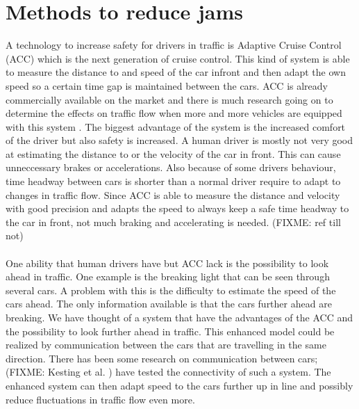 \section{Methods to reduce jams}
A technology to increase safety for drivers in traffic is Adaptive Cruise
Control (ACC) which is the next generation of cruise control. This kind of
system is able to measure the distance to and speed of the car infront and then
adapt the own speed so a certain time gap is maintained between the cars. ACC
is already commercially available on the market and there is much research
going on to determine the effects on traffic flow when more and more vehicles are
equipped with this system \cite{acc}. The biggest advantage of the system
is the increased comfort of the driver but also safety is increased. A human
driver is mostly not very good at estimating the distance to or the velocity of the car
in front. This can cause unneccessary brakes or accelerations. Also because of
some drivers behaviour, time headway between cars is shorter than a normal
driver require to adapt to changes in traffic flow. Since ACC is
able to measure the distance and velocity with good precision and adapts
the speed to always keep a safe time headway to the car in front, not much
braking and accelerating is needed. (FIXME: ref till not)\\\\

One ability that human drivers have but ACC lack is the possibility to look
ahead in traffic. One example is the breaking light that can be seen through
several cars. 
 A problem with this is the difficulty to estimate the speed of the
cars ahead. The only information available is that the cars further ahead are
breaking. We have thought of a system that have the advantages of the ACC and
the possibility to look further ahead in traffic. This enhanced model could
be realized by communication between the cars that are travelling in the same
direction. 
There has been some research on communication between cars;
(FIXME: Kesting et al. ) have tested the connectivity of such a system. The
enhanced system can then adapt speed to the cars further up in line
and possibly reduce fluctuations in traffic flow even more.
